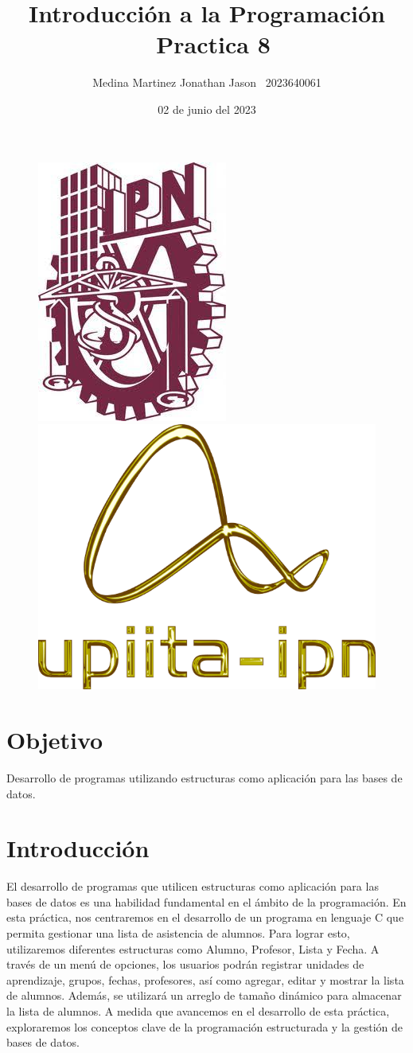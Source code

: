 \documentclass{article}
\title{Introducción a la Programación \ Practica 8}
\author{Medina Martinez Jonathan Jason \ 2023640061}
\date{02 de junio del 2023}
\begin{document}
	
	\fontsize{12}{16}\selectfont
	
	\begin{figure}[t] %
		
		\includegraphics[width=2.5 cm]{Logo1.jpeg}
		\hfill
		\includegraphics[width=3 cm]{Logo2.png}
		
	\end{figure}
	
	\maketitle %
	\newpage
	
	\tableofcontents %
	\newpage
	
	\section{Objetivo}
	
	Desarrollo de programas utilizando estructuras como aplicación para las bases de datos.
	
	\section{Introducción}
	
	El desarrollo de programas que utilicen estructuras como aplicación para las bases de datos es una habilidad fundamental en el ámbito de la programación. En esta práctica, nos centraremos en el desarrollo de un programa en lenguaje C que permita gestionar una lista de asistencia de alumnos. Para lograr esto, utilizaremos diferentes estructuras como Alumno, Profesor, Lista y Fecha. A través de un menú de opciones, los usuarios podrán registrar unidades de aprendizaje, grupos, fechas, profesores, así como agregar, editar y mostrar la lista de alumnos. Además, se utilizará un arreglo de tamaño dinámico para almacenar la lista de alumnos. A medida que avancemos en el desarrollo de esta práctica, exploraremos los conceptos clave de la programación estructurada y la gestión de bases de datos.
	
\end{document}
